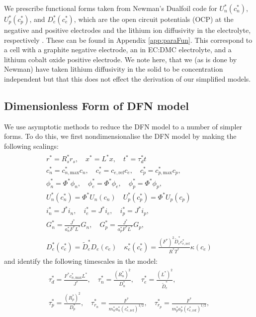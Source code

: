\documentclass[preprint]{elsarticle}
\begin{document}
We prescribe functional forms taken from Newman's Dualfoil code for $U_n^*(c_n^*)$, $U_p^*(c_p^*)$, and $D_e^*(c_e^*)$, which are the open circuit potentials (OCP) at the negative and positive electrodes and the lithium ion diffusivity in the electrolyte, respectively \cite{newman2004fortran}. These can be found in Appendix \ref{app:paraFun}. This correspond to a cell with a graphite negative electrode, an  in EC:DMC electrolyte, and a lithium cobalt oxide positive electrode. We note here, that we (as is done by Newman) have taken lithium diffusivity in the solid to be concentration independent but that this does not effect the derivation of our simplified models. 

\subsection{Dimensionless Form of DFN model}
We use asymptotic methods to reduce the DFN model to a number of simpler forms. To do this, we first nondimensionalise the DFN model by making the following scalings: 
\begin{gather}	
	\begin{split}
	r^* = R_s^* r_s, \quad x^* = L^* x, \quad t^* = \tau_d^* t \\ 
    c_n^* = c_{n,\text{max}}^*c_n, \quad c_e^* = c_{e,\text{ref}} c_e, \quad c_p^* = c_{p,\text{max}}^* c_p, \\
    \phi_n^* = \Phi^* \phi_n, \quad \phi_e^* = \Phi^* \phi_e, \quad \phi_p^*=\Phi^* \phi_p, \\ 
    U_n^*(c_n^*) = \Phi^* U_n(c_n) \quad U_p^*(c_p^*) = \Phi^* U_p(c_p) \\
    i_n^*= J^* i_n, \quad i_e^* = J^* i_e, \quad i_p^* = J^* i_p, \\ 
    G_n^* = \frac{J^*}{a_n^* F^* L^*}G_n, \quad G_p^* = \frac{J^*}{a_p^* F^* L^*}G_p, \\ 
    D_e^*(c_e^*) = \tilde{D}_e^* D_e(c_e) \quad 
    \kappa^*_e(c_e^*) = \frac{(F^*)^2 \tilde{D}_e^* c_{e,\text{ref}}^*}{R^*T^*}\kappa(c_e)
    \end{split}
\end{gather} 
and identify the following timescales in the model: 
\begin{gather} 
	\begin{split}
	\tau_d^*=\frac{F^* c_{n,\text{max}}^* L^*}{J^*},\quad \tau_n^* = \frac{(R_n^*)^2}{D_n^*}, \quad \tau_e^* = \frac{(L^*)^2}{\tilde{D}_e^*}, \\ \tau_p^* = \frac{(R_p^*)^2}{D_p^*}, \quad \tau_{r_n}^* = \frac{F^*}{m_n^* a_n^* (c_{e,\text{ref}}^*)^{1/2}}, \quad \tau_{r_p}^* = \frac{F^*}{m_p^* a_p^* (c_{e,\text{ref}}^*)^{1/2}},
    \end{split}
\end{gather} 
\end{document}
